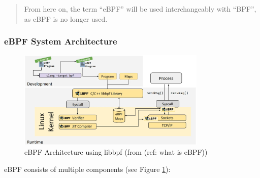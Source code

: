 \begin{quote}
From here on, the term ``eBPF'' will be used interchangeably with ``BPF'', as cBPF is no longer
used.
\end{quote}

\subsubsection{eBPF System Architecture}

\begin{figure}[htpb]
    \centering
    \includegraphics[width=0.8\textwidth]{diagrams/ebpf-architecture.png}
    \caption{eBPF Architecture using libbpf (from (ref: what is eBPF))}
    \label{fig:bpf-arch}
\end{figure}

eBPF consists of multiple components (see Figure \ref{fig:bpf-arch}):

